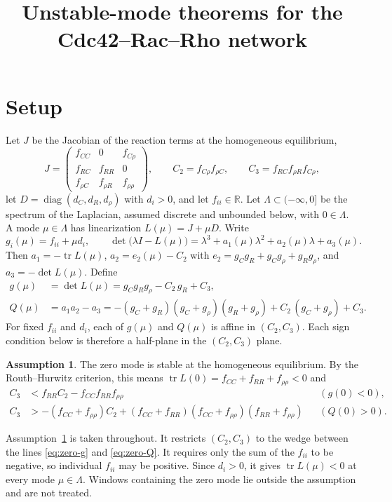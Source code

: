 \documentclass[11pt]{article}
\title{Unstable-mode theorems for the Cdc42--Rac--Rho network}
\author{}
\date{}
\theoremstyle{definition}
\newtheorem{assumption}{Assumption}
\theoremstyle{remark}
\begin{document}
\maketitle

\section{Setup}

Let $J$ be the Jacobian of the reaction terms at the homogeneous equilibrium,
\[
J=\begin{pmatrix} f_{CC} & 0 & f_{C\rho}\\ f_{RC} & f_{RR} & 0\\ f_{\rho C} & f_{\rho R} & f_{\rho\rho}\end{pmatrix},
\qquad
C_2=f_{C\rho}f_{\rho C},\qquad C_3=f_{RC}f_{\rho R}f_{C\rho},
\]
let $D=\operatorname{diag}(d_C,d_R,d_\rho)$ with $d_i>0$, and let $f_{ii}\in\mathbb{R}$. Let $\Lambda\subset(-\infty,0]$ be the spectrum of the Laplacian, assumed discrete and unbounded below, with $0\in\Lambda$. A mode $\mu\in\Lambda$ has linearization $L(\mu)=J+\mu D$. Write
\[
g_i(\mu)=f_{ii}+\mu d_i,
\qquad
\det\bigl(\lambda I-L(\mu)\bigr)=\lambda^3+a_1(\mu)\lambda^2+a_2(\mu)\lambda+a_3(\mu).
\]
Then $a_1=-\operatorname{tr}L(\mu)$, $a_2=e_2(\mu)-C_2$ with $e_2=g_Cg_R+g_Cg_\rho+g_Rg_\rho$, and $a_3=-\det L(\mu)$. Define
\begin{align}
g(\mu)&=\det L(\mu)=g_Cg_Rg_\rho-C_2\,g_R+C_3, \label{eq:g}\\
Q(\mu)&=a_1a_2-a_3=-(g_C+g_R)(g_C+g_\rho)(g_R+g_\rho)+C_2\,(g_C+g_\rho)+C_3. \label{eq:Q}
\end{align}
For fixed $f_{ii}$ and $d_i$, each of $g(\mu)$ and $Q(\mu)$ is affine in $(C_2,C_3)$. Each sign condition below is therefore a half-plane in the $(C_2,C_3)$ plane.

\begin{assumption}\label{ass:zero}
The zero mode is stable at the homogeneous equilibrium. By the Routh--Hurwitz criterion, this means $\operatorname{tr}L(0)=f_{CC}+f_{RR}+f_{\rho\rho}<0$ and
\begin{align}
C_3&<f_{RR}C_2-f_{CC}f_{RR}f_{\rho\rho} && (g(0)<0), \label{eq:zero-g}\\
C_3&>-(f_{CC}+f_{\rho\rho})C_2+(f_{CC}+f_{RR})(f_{CC}+f_{\rho\rho})(f_{RR}+f_{\rho\rho}) && (Q(0)>0). \label{eq:zero-Q}
\end{align}
\end{assumption}

Assumption~\ref{ass:zero} is taken throughout. It restricts $(C_2,C_3)$ to the wedge between the lines \eqref{eq:zero-g} and \eqref{eq:zero-Q}. It requires only the sum of the $f_{ii}$ to be negative, so individual $f_{ii}$ may be positive. Since $d_i>0$, it gives $\operatorname{tr}L(\mu)<0$ at every mode $\mu\in\Lambda$. Windows containing the zero mode lie outside the assumption and are not treated.
\end{document}
